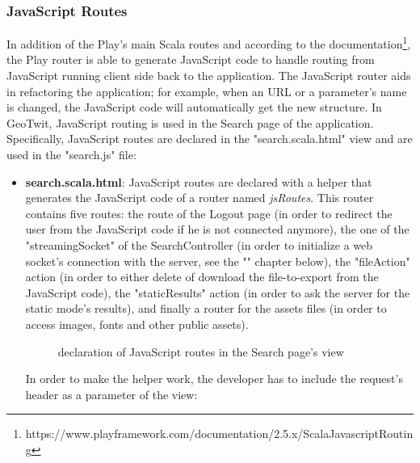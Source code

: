 \documentclass[a4paper,11pt]{report}
\begin{document}
\subsubsection{JavaScript Routes}
In addition of the Play's main Scala routes and according to the documentation\footnote{https://www.playframework.com/documentation/2.5.x/ScalaJavascriptRouting}, the Play router is able to generate JavaScript code to handle routing from JavaScript running client side back to the application. The JavaScript router aids in refactoring the application; for example, when an URL or a parameter's name is changed, the JavaScript code will automatically get the new structure.
In GeoTwit, JavaScript routing is used in the Search page of the application. Specifically, JavaScript routes are declared in the "search.scala.html" view and are used in the "search.js" file:
\begin{itemize}
	\item \textbf{search.scala.html}: JavaScript routes are declared with a helper that generates the JavaScript code of a router named \emph{jsRoutes}. This router contains five routes: the route of the Logout page (in order to redirect the user from the JavaScript code if he is not connected anymore), the one of the "streamingSocket" of the SearchController (in order to initialize a web socket's connection with the server, see the "" chapter below), the "fileAction" action (in order to either delete of download the file-to-export from the JavaScript code), the "staticResults" action (in order to ask the server for the static mode's results), and finally a router for the assets files (in order to access images, fonts and other public assets).
	\begin{figure}[H]
	\vspace{-5pt}
	\begin{center}
	\vspace{-5pt}
	\caption{declaration of JavaScript routes in the Search page's view}
	\end{center}
	\end{figure}
	In order to make the helper work, the developer has to include the request's header as a parameter of the view: 

\end{itemize}
\end{document}
